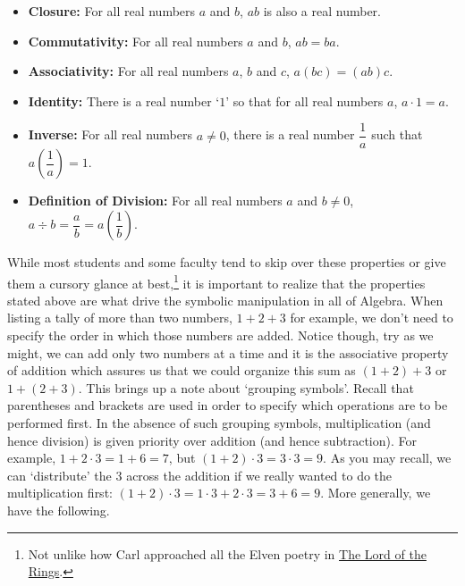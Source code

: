 \medskip

\label{realnumbermultiplication}

\colorbox{ResultColor}{\bbm
\begin{thm}

\begin{itemize}

\item  \textbf{Closure:}  For all real numbers $a$ and $b$,  $ab$ is also a real number.

\item  \textbf{Commutativity:}  For all real numbers $a$ and $b$, $ab = ba$.

\item  \textbf{Associativity:}  For all real numbers $a$, $b$ and $c$, $a(bc) = (ab)c$.

\item  \textbf{Identity:}  There is a real number `$1$' so that for all real numbers $a$, $a \cdot 1 = a$.

\item  \textbf{Inverse:}  For all real numbers $a \neq 0$, there is a real number $\dfrac{1}{a}$ such that $a \left(\dfrac{1}{a}\right) = 1$.

\item \textbf{Definition of Division:}  For all real numbers $a$ and $b \neq 0$, $a \div b = \dfrac{a}{b} = a  \left(\dfrac{1}{b}\right)$.

\end{itemize}
\end{thm}
\ebm}

\medskip

While most students and some faculty tend to skip over these properties or give them a cursory glance at best,\footnote{Not unlike how Carl approached all the Elven poetry in \underline{The Lord of the Rings}.} it is important to realize that the properties stated above are what drive the symbolic manipulation in all of Algebra.  When listing a tally of more than two numbers, $1 + 2 + 3$\label{howtoaddonetwothree} for example, we don't need to specify the order in which those numbers are added. Notice though, try as we might, we can add only two numbers at a time and it is the associative property of addition which assures us that we could organize this sum as $(1+2) + 3$ or $1+(2+3)$.  This brings up a note about `grouping symbols'.  Recall that parentheses and brackets are used in order to specify which operations are to be performed first.  In the absence of such grouping symbols, multiplication (and hence division) is given priority over addition (and hence subtraction). For example, $1 + 2 \cdot 3 = 1+6 = 7$, but $(1+2) \cdot 3 = 3 \cdot 3 = 9$.  As you may recall, we can `distribute' the $3$ across the addition if we really wanted to do the multiplication first:  $(1+2) \cdot 3 = 1\cdot 3 + 2 \cdot 3 = 3 + 6 = 9$. More generally, we have the following.


